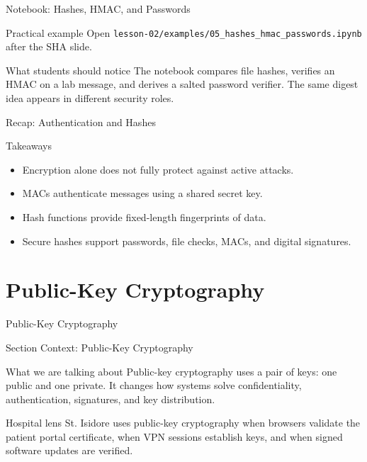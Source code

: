 \documentclass[presentation]{beamer}
\newcommand{\sectiontitleframe}[1]{
\begin{frame}[plain,c]
\begin{center}
{\usebeamerfont{title}\usebeamercolor[fg]{title}#1}
\end{center}
\end{frame}
}
\begin{document}
\begin{frame}[c]{Notebook: Hashes, HMAC, and Passwords}
\begin{block}{Practical example}
Open \texttt{lesson-02/examples/05\_hashes\_hmac\_passwords.ipynb} after the SHA slide.
\end{block}

\begin{exampleblock}{What students should notice}
The notebook compares file hashes, verifies an HMAC on a lab message, and derives a salted password
verifier. The same digest idea appears in different security roles.
\end{exampleblock}
\end{frame}

\begin{frame}[c]{Recap: Authentication and Hashes}
\begin{block}{Takeaways}
\begin{itemize}
    \item Encryption alone does not fully protect against active attacks.
    \item MACs authenticate messages using a shared secret key.
    \item Hash functions provide fixed-length fingerprints of data.
    \item Secure hashes support passwords, file checks, MACs, and digital signatures.
\end{itemize}
\end{block}
\end{frame}

\section{Public-Key Cryptography}
\sectiontitleframe{Public-Key Cryptography}

\begin{frame}[c]{Section Context: Public-Key Cryptography}
\begin{block}{What we are talking about}
Public-key cryptography uses a pair of keys: one public and one private. It changes how systems
solve confidentiality, authentication, signatures, and key distribution.
\end{block}

\begin{exampleblock}{Hospital lens}
St. Isidore uses public-key cryptography when browsers validate the patient portal certificate,
when VPN sessions establish keys, and when signed software updates are verified.
\end{exampleblock}
\end{frame}
\end{document}
